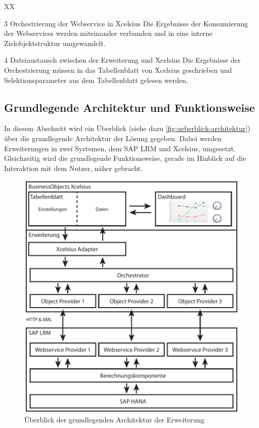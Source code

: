 \begin{onehalfspacing}
\begin{seToplist} { XX }
\item[3] Orchestrierung der Webservice in \gls{Xcelsius} \newline
Die Ergebnisse der Konsumierung der Webservices werden miteinander verbunden und in eine interne Zielobjektstruktur umgewandelt.

\item[4] Dateiaustausch zwischen der Erweiterung und \gls{Xcelsius} \newline
Die Ergebnisse der Orchestrierung müssen in das Tabellenblatt von \gls{Xcelsius} geschrieben und Selektionsparameter aus dem Tabellenblatt gelesen werden.

\end{seToplist}

\subsection{Grundlegende Architektur und Funktionsweise}
In diesem Abschnitt wird ein Überblick (siehe dazu \vref{fig:ueberblick-architektur}) über die grundlegende Architektur der Lösung gegeben. Dabei werden Erweiterungen in zwei Systemen, dem SAP LRM und \gls{Xcelsius}, umgesetzt. Gleichzeitig wird die grundlegende Funktionsweise, gerade im Hinblick auf die Interaktion mit dem Nutzer, näher gebracht.

\begin{figure}[!ht]
\centering
\setlength{\unitlength}{1mm}
\includegraphics[width=15cm]{images/Abbildung11-Architektur-Erweiterung.pdf}
\caption{Überblick der grundlegenden Architektur der Erweiterung\label{fig:ueberblick-architektur}}
\end{figure}


\end{onehalfspacing}
